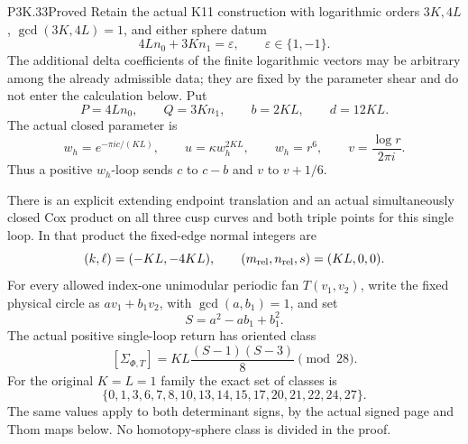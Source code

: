 \begin{statement}{P3K.33}{Proved}
Retain the actual K11 construction with logarithmic orders \(3K,4L\),
\(\gcd(3K,4L)=1\), and either sphere datum
\[
       4Ln_0+3Kn_1=\varepsilon,\qquad \varepsilon\in\{1,-1\}.
\]
The additional delta coefficients of the finite logarithmic vectors may
be arbitrary among the already admissible data; they are fixed by the
parameter shear and do not enter the calculation below. Put
\[
 P=4Ln_0,\qquad Q=3Kn_1,\qquad b=2KL,\qquad d=12KL.
\]
The actual closed parameter is
\[
 w_h=e^{-\pi i c/(KL)},\qquad u=\kappa w_h^{2KL},
 \qquad w_h=r^6,\qquad v=\frac{\log r}{2\pi i}.
\]
Thus a positive \(w_h\)-loop sends \(c\) to \(c-b\) and
\(v\) to \(v+1/6\).

There is an explicit extending endpoint translation and an actual
simultaneously closed Cox product on all three cusp curves and both
triple points for this single loop. In that product the fixed-edge
normal integers are
\[
          (k,\ell)=(-KL,-4KL),\qquad
          (m_{\rm rel},n_{\rm rel},s)=(KL,0,0).
\]
For every allowed index-one unimodular periodic fan \(T(v_1,v_2)\),
write the fixed physical circle as \(a v_1+b_1v_2\), with
\(\gcd(a,b_1)=1\), and set
\[
                 S=a^2-ab_1+b_1^2.
\]
The actual positive single-loop return has oriented class
\[
       [\Sigma_{\Phi,T}]
          =KL\frac{(S-1)(S-3)}8\pmod {28}.                 \tag{P3K.33.1}
\]
For the original \(K=L=1\) family the exact set of classes is
\[
 \{0,1,3,6,7,8,10,13,14,15,17,20,21,22,24,27\}.
\]
The same values apply to both determinant signs, by the actual signed
page and Thom maps below. No homotopy-sphere class is divided in the proof.
\end{statement}

